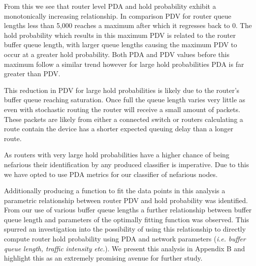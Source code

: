 From this we see that router level PDA and hold probability exhibit a monotonically increasing relationship. In comparison PDV for router queue lengths less than 5,000 reaches a maximum  after which it regresses back to 0. The hold probability which results in this maximum PDV is related to the router buffer queue length, with larger queue lengths causing the maximum PDV to occur at a greater hold probability. Both PDA and PDV values before this maximum follow a similar trend however for large hold probabilities PDA is far greater than PDV.\par
This reduction in PDV for large hold probabilities is likely due to the router's buffer queue reaching saturation. Once full the queue length varies very little as even with stochastic routing the router will receive a small amount of packets. These packets are likely from either a connected switch or routers calculating a route contain the device has a shorter expected queuing delay than a longer route.\par
As routers with very large hold probabilities have a higher chance of being nefarious their identification by any produced classifier is imperative. Due to this we have opted to use PDA metrics for our classifier of nefarious nodes.\par
Additionally producing a function to fit the data points in this analysis a parametric relationship between router PDV and hold probability was identified. From our use of various buffer queue lengths a further relationship between buffer queue length and parameters of the optimally fitting function was observed. This spurred an investigation into the possibility of using this relationship to directly compute router hold probability using PDA and network parameters (\textit{i.e. buffer queue length, traffic intensity etc.}). We present this analysis in Appendix B and highlight this as an extremely promising avenue for further study.

